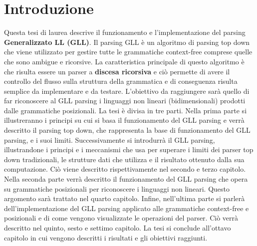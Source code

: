 \chapter{Introduzione}
Questa tesi di laurea descrive il funzionamento e l'implementazione del parsing \textbf{Generalizzato LL (GLL)}. Il parsing GLL è un algoritmo di parsing top down che viene utilizzato per gestire tutte le grammatiche context-free comprese quelle che sono ambigue e ricorsive. La caratteristica principale di questo algoritmo è che risulta essere un parser a \textbf{discesa ricorsiva} e ciò permette di avere il controllo del flusso sulla struttura della grammatica e di conseguenza risulta semplice da implementare e da testare. L'obiettivo da raggiungere sarà quello di far riconoscere al GLL parsing i linguaggi non lineari (bidimensionali) prodotti dalle grammatiche posizionali. La tesi è divisa in tre parti. Nella prima parte si illustreranno i principi su cui si basa il funzionamento del GLL parsing e verrà descritto il parsing top down, che rappresenta la base di funzionamento del GLL parsing, e i suoi limiti. Successivamente si introdurrà il GLL parsing, illustrandone i principi e i meccanismi che usa per superare i limiti dei parser top down tradizionali, le strutture dati che utilizza e il risultato ottenuto dalla sua computazione. Ciò viene descritto rispettivamente nel secondo e terzo capitolo. Nella seconda parte verrà descritto il funzionamento del GLL parsing che opera su grammatiche posizionali per riconoscere i linguaggi non lineari. Questo argomento sarà trattato nel quarto capitolo. Infine, nell'ultima parte si parlerà dell'implementazione del GLL parsing applicato alle grammatiche context-free e posizionali e di come vengono visualizzate le operazioni del parser. Ciò verrà descritto nel quinto, sesto e settimo capitolo. La tesi si conclude all'ottavo capitolo in cui vengono descritti i risultati e gli obiettivi raggiunti.